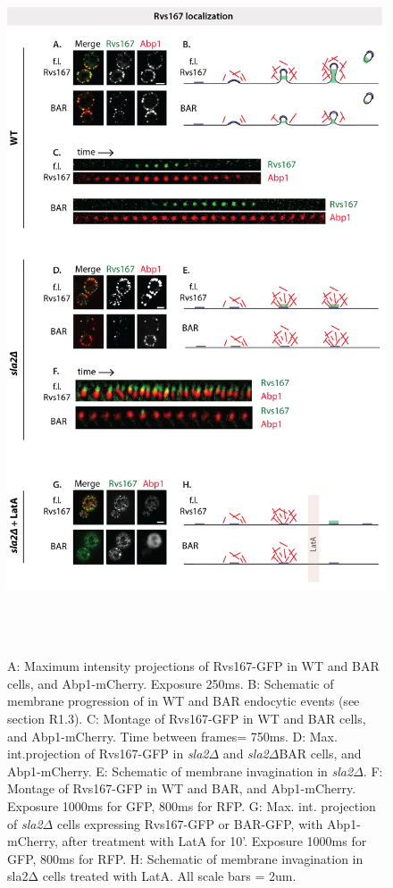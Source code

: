  
	\begin{figure}
	\centering
	\includegraphics[width=21cm,height=21cm,keepaspectratio]{figures/results_final/sla2_del_final7}
	\caption [Localization of Rvs167 and BAR with and without membrane curvature]
{A: Maximum intensity projections of Rvs167-GFP in WT and BAR cells, and Abp1-mCherry. Exposure 250ms. B: Schematic of membrane progression of in WT and BAR endocytic events (see section R1.3).
C: Montage of Rvs167-GFP in WT and BAR cells, and Abp1-mCherry. Time between frames= 750ms.
D: Max. int.projection of Rvs167-GFP in \textit{sla2$\Delta$} and \textit{sla2$\Delta$}BAR cells, and Abp1-mCherry. 
E: Schematic of membrane invagination in  \textit{sla2$\Delta$}. F: Montage of Rvs167-GFP in WT and BAR, and Abp1-mCherry. Exposure 1000ms for GFP, 800ms for RFP. 
G: Max. int. projection of \textit{sla2$\Delta$} cells expressing Rvs167-GFP or BAR-GFP, with Abp1-mCherry, after treatment with LatA for 10’. Exposure 1000ms for GFP, 800ms for RFP. H: Schematic of membrane invagination in sla2Δ cells treated with LatA. 
All scale bars = 2um.
	\label{fig2_sla2del}}
	\end{figure}



